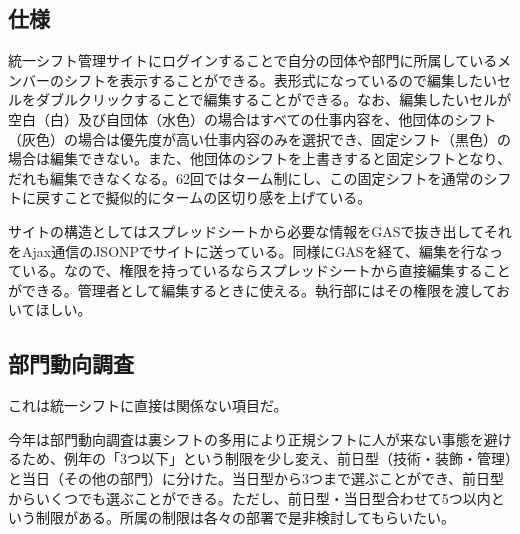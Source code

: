 \documentclass[dvipdfmx,jb5]{jreport}
\begin{document}
\subsection{仕様}
統一シフト管理サイトにログインすることで自分の団体や部門に所属しているメンバーのシフトを表示することができる。表形式になっているので編集したいセルをダブルクリックすることで編集することができる。なお、編集したいセルが空白（白）及び自団体（水色）の場合はすべての仕事内容を、他団体のシフト（灰色）の場合は優先度が高い仕事内容のみを選択でき、固定シフト（黒色）の場合は編集できない。また、他団体のシフトを上書きすると固定シフトとなり、だれも編集できなくなる。62回ではターム制にし、この固定シフトを通常のシフトに戻すことで擬似的にタームの区切り感を上げている。

サイトの構造としてはスプレッドシートから必要な情報をGASで抜き出してそれをAjax通信のJSONPでサイトに送っている。同様にGASを経て、編集を行なっている。なので、権限を持っているならスプレッドシートから直接編集することができる。管理者として編集するときに使える。執行部にはその権限を渡しておいてほしい。

\subsection{部門動向調査}\label{sec:統一シフト-部門動向調査}
これは統一シフトに直接は関係ない項目だ。

今年は部門動向調査は裏シフトの多用により正規シフトに人が来ない事態を避けるため、例年の「3つ以下」という制限を少し変え、前日型（技術・装飾・管理）と当日（その他の部門）に分けた。当日型から3つまで選ぶことができ、前日型からいくつでも選ぶことができる。ただし、前日型・当日型合わせて5つ以内という制限がある。所属の制限は各々の部署で是非検討してもらいたい。
\end{document}
